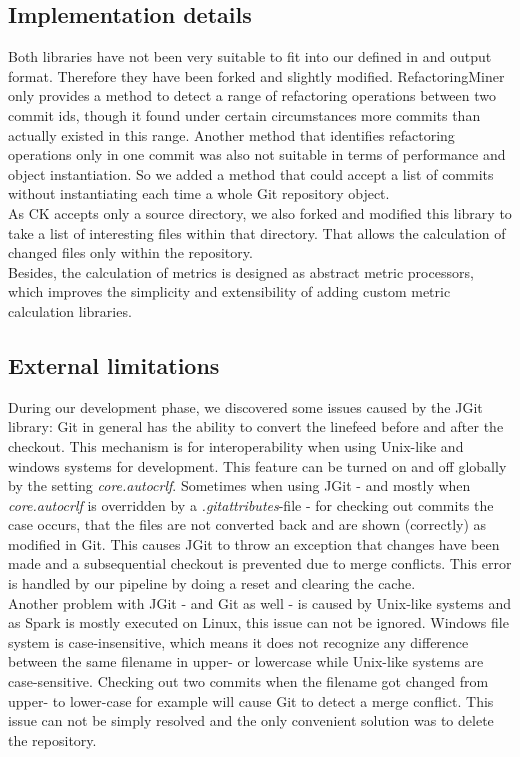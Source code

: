 \documentclass[conference]{IEEEtran}
\begin{document}
\subsection{Implementation details}
Both libraries have not been very suitable to fit into our defined in and output format. Therefore they have been forked and slightly modified. RefactoringMiner only provides a method to detect a range of refactoring operations between two commit ids, though it found under certain circumstances more commits than actually existed in this range. Another method that identifies refactoring operations only in one commit was also not suitable in terms of performance and object instantiation. So we added a method that could accept a list of commits without instantiating each time a whole Git repository object. \\
As CK accepts only a source directory, we also forked and modified this library to take a list of interesting files within that directory. That allows the calculation of changed files only within the repository.\\
Besides, the calculation of metrics is designed as abstract metric processors, which improves the simplicity and extensibility of adding custom metric calculation libraries.
\subsection{External limitations}
During our development phase, we discovered some issues caused by the JGit library: Git in general has the ability to convert the linefeed before and after the checkout. This mechanism is for interoperability when using Unix-like and windows systems for development. This feature can be turned on and off globally by the setting \emph{core.autocrlf}. Sometimes when using JGit - and mostly when \emph{core.autocrlf} is overridden by a \emph{.gitattributes}-file - for checking out commits the case occurs, that the files are not converted back and are shown (correctly) as modified in Git. This causes JGit to throw an exception that changes have been made and a subsequential checkout is prevented due to merge conflicts. This error is handled by our pipeline by doing a reset and clearing the cache.\\
Another problem with JGit - and Git as well - is caused by Unix-like systems and as Spark is mostly executed on Linux, this issue can not be ignored. Windows file system is case-insensitive, which means it does not recognize any difference between the same filename in upper- or lowercase while Unix-like systems are case-sensitive. Checking out two commits when the filename got changed from upper- to lower-case for example will cause Git to detect a merge conflict. This issue can not be simply resolved and the only convenient solution was to delete the repository. 
\end{document}
